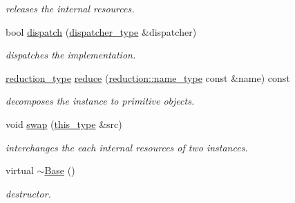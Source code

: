 \begin{DoxyCompactItemize}
\begin{DoxyCompactList}\small\item\em releases the internal resources. \end{DoxyCompactList}\item 
\hypertarget{classhryky_1_1http_1_1header_1_1product__comment_1_1_base_aef756d94ec270c120024d1f04176851d}{bool \hyperlink{classhryky_1_1http_1_1header_1_1product__comment_1_1_base_aef756d94ec270c120024d1f04176851d}{dispatch} (\hyperlink{classhryky_1_1http_1_1header_1_1product__comment_1_1dispatcher_1_1_base}{dispatcher\-\_\-type} \&dispatcher)}\label{classhryky_1_1http_1_1header_1_1product__comment_1_1_base_aef756d94ec270c120024d1f04176851d}

\begin{DoxyCompactList}\small\item\em dispatches the implementation. \end{DoxyCompactList}\item 
\hypertarget{classhryky_1_1http_1_1header_1_1product__comment_1_1_base_a2809ad5f75abd2266e6804e90094bc05}{\hyperlink{namespacehryky_a343a9a4c36a586be5c2693156200eadc}{reduction\-\_\-type} \hyperlink{classhryky_1_1http_1_1header_1_1product__comment_1_1_base_a2809ad5f75abd2266e6804e90094bc05}{reduce} (\hyperlink{namespacehryky_1_1reduction_ac686c30a4c8d196bbd0f05629a6b921f}{reduction\-::name\-\_\-type} const \&name) const }\label{classhryky_1_1http_1_1header_1_1product__comment_1_1_base_a2809ad5f75abd2266e6804e90094bc05}

\begin{DoxyCompactList}\small\item\em decomposes the instance to primitive objects. \end{DoxyCompactList}\item 
\hypertarget{classhryky_1_1http_1_1header_1_1product__comment_1_1_base_ab2b137d16fbe40d839ee136bd5304cab}{void \hyperlink{classhryky_1_1http_1_1header_1_1product__comment_1_1_base_ab2b137d16fbe40d839ee136bd5304cab}{swap} (\hyperlink{classhryky_1_1http_1_1header_1_1product__comment_1_1_base_a2b2b9c50e25b1bbd7c1a77a69477409a}{this\-\_\-type} \&src)}\label{classhryky_1_1http_1_1header_1_1product__comment_1_1_base_ab2b137d16fbe40d839ee136bd5304cab}

\begin{DoxyCompactList}\small\item\em interchanges the each internal resources of two instances. \end{DoxyCompactList}\item 
\hypertarget{classhryky_1_1http_1_1header_1_1product__comment_1_1_base_a722da881b6c70cfcbde9243abcfbf334}{virtual \hyperlink{classhryky_1_1http_1_1header_1_1product__comment_1_1_base_a722da881b6c70cfcbde9243abcfbf334}{$\sim$\-Base} ()}\label{classhryky_1_1http_1_1header_1_1product__comment_1_1_base_a722da881b6c70cfcbde9243abcfbf334}

\begin{DoxyCompactList}\small\item\em destructor. \end{DoxyCompactList}\end{DoxyCompactItemize}
